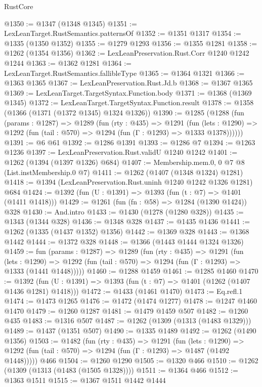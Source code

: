 \begin{lexlean}{RustCore}
\begin{coremodule}
@1350 := @1347 (@1348 @1345)
@1351 := LexLeanTarget.RustSemantics.patternsOf
@1352 := @1351 @1317
@1354 := @1335 (@1350 @1352)
@1355 := @1279 @1293
@1356 := @1355 @1281
@1358 := @1262 (@1354 @1356)
@1362 := LexLeanPreservation.Rust.Corr @1240 @1242 @1244
@1363 := @1362 @1281
@1364 := LexLeanTarget.RustSemantics.fallibleType
@1365 := @1364 @1321
@1366 := @1363 @1365
@1367 := LexLeanPreservation.Rust.Jd.b
@1368 := @1367 @1365
@1369 := LexLeanTarget.TargetSyntax.Function.body
@1371 := @1368 (@1369 @1345)
@1372 := LexLeanTarget.TargetSyntax.Function.result
@1378 := @1358 (@1366 (@1371 (@1372 @1345) @1324 @1326))
@1390 := @1285
    (@1288
      (fun (params : @1287) =>
      @1289
        (fun (rty : @435) =>
        @1291
          (fun (lets : @1290) =>
          @1292 (fun (tail : @570) => @1294 (fun (Γ : @1293) => @1333 @1378))))))
@1391 := @6 @61
@1392 := @1286 @1391
@1393 := @1286 @7
@1394 := @1263 @1236
@1397 := LexLeanPreservation.Rust.validU @1240 @1242
@1401 := @1262 (@1394 (@1397 @1326) @684)
@1407 := Membership.mem.{0, 0} @7 @8 (List.instMembership.{0} @7)
@1411 := @1262 (@1407 (@1348 @1324) @1281)
@1418 := @1394 (LexLeanPreservation.Rust.uninh @1240 @1242 @1326 @1281) @684
@1424 := @1392 (fun (U : @1391) => @1393 (fun (t : @7) => @1401 (@1411 @1418)))
@1429 := @1261 (fun (fn : @58) => @1284 (@1390 @1424)) @328
@1430 := And.intro
@1433 := @1430 (@1278 (@1280 @328))
@1435 := @1343 (@1344 @328)
@1436 := @1348 @328
@1437 := @1435 @1436
@1441 := @1262 (@1335 (@1437 @1352) @1356)
@1442 := @1369 @328
@1443 := @1368 @1442
@1444 := @1372 @328
@1448 := @1366 (@1443 @1444 @1324 @1326)
@1459 := fun (params : @1287) =>
  @1289
    (fun (rty : @435) =>
    @1291
      (fun (lets : @1290) =>
      @1292 (fun (tail : @570) => @1294 (fun (Γ : @1293) => @1333 (@1441 @1448)))))
@1460 := @1288 @1459
@1461 := @1285 @1460
@1470 := @1392 (fun (U : @1391) => @1393 (fun (t : @7) => @1401 (@1262 (@1407 @1436 @1281) @1418)))
@1472 := @1433 (@1461 @1470)
@1473 := Eq.refl.{1}
@1474 := @1473 @1265
@1476 := @1472 (@1474 @1277)
@1478 := @1247 @1460 @1470
@1479 := @1260 @1287
@1481 := @1479 @1459 @507
@1482 := @1260 @435
@1483 := @1316 @507
@1487 := @1262 (@1309 (@1313 (@1483 @1329)))
@1489 := @1437 (@1351 @507)
@1490 := @1335 @1489
@1492 := @1262 (@1490 @1356)
@1503 := @1482
    (fun (rty : @435) =>
    @1291
      (fun (lets : @1290) =>
      @1292 (fun (tail : @570) => @1294 (fun (Γ : @1293) => @1487 (@1492 @1448)))))
    @466
@1504 := @1260 @1290
@1505 := @1320 @466
@1510 := @1262 (@1309 (@1313 (@1483 (@1505 @1328))))
@1511 := @1364 @466
@1512 := @1363 @1511
@1515 := @1367 @1511 @1442 @1444

\end{coremodule}
\end{lexlean}
